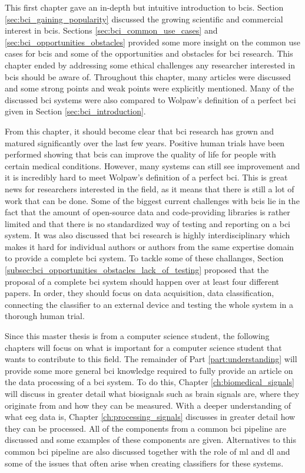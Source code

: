 This first chapter gave an in-depth but intuitive introduction to \glspl{bci}.
Section \ref{sec:bci_gaining_popularity} discussed the growing scientific and commercial interest in \glspl{bci}.
Sections \ref{sec:bci_common_use_cases} and \ref{sec:bci_opportunities_obstacles} provided some more insight on the common use cases for \glspl{bci} and some of the opportunities and obstacles for \gls{bci} research.
This chapter ended by addressing some ethical challenges any researcher interested in \glspl{bci} should be aware of.
Throughout this chapter, many articles were discussed and some strong points and weak points were explicitly mentioned.
Many of the discussed \gls{bci} systems were also compared to Wolpaw's definition of a perfect \gls{bci} given in Section \ref{sec:bci_introduction}.

From this chapter, it should become clear that \gls{bci} research has grown and matured significantly over the last few years.
Positive human trials have been performed showing that \glspl{bci} can improve the quality of life for people with certain medical conditions.
However, many systems can still see improvement and it is incredibly hard to meet Wolpaw's definition of a perfect \gls{bci}.
This is great news for researchers interested in the field, as it means that there is still a lot of work that can be done.
Some of the biggest current challenges with \glspl{bci} lie in the fact that the amount of open-source data and code-providing libraries is rather limited and that there is no standardized way of testing and reporting on a \gls{bci} system.
It was also discussed that \gls{bci} research is highly interdisciplinary which makes it hard for individual authors or authors from the same expertise domain to provide a complete \gls{bci} system.
To tackle some of these challanges, Section \ref{subsec:bci_opportunities_obstacles_lack_of_testing} proposed that the proposal of a complete \gls{bci} system should happen over at least four different papers.
In order, they should focus on data acquisition, data classification, connecting the classifier to an external device and testing the whole system in a thorough human trial.

Since this master thesis is from a computer science student, the following chapters will focus on what is important for a computer science student that wants to contribute to this field.
The remainder of Part \ref{part:understanding} will provide some more general \gls{bci} knowledge required to fully provide an article on the data processing of a \gls{bci} system.
To do this, Chapter \ref{ch:biomedical_signals} will discuss in greater detail what \glspl{biosignal} such as brain signals are, where they originate from and how they can be measured.
With a deeper understanding of what \gls{eeg} data is, Chapter \ref{ch:processing_signals} discusses in greater detail how they can be processed.
All of the components from a common \gls{bci} pipeline are discussed and some examples of these components are given.
Alternatives to this common \gls{bci} pipeline are also discussed together with the role of \gls{ml} and \gls{dl} and some of the issues that often arise when creating classifiers for these systems.

